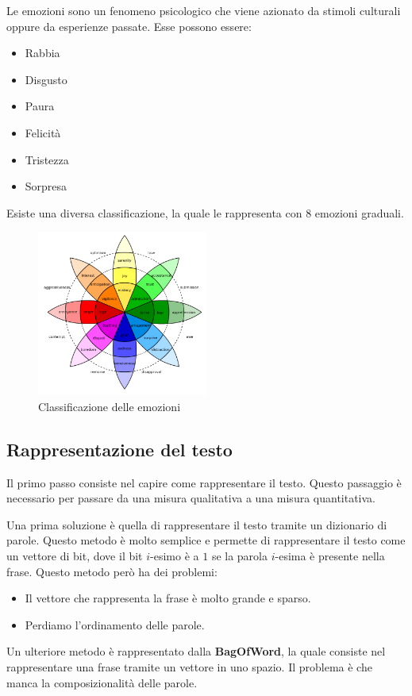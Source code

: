 \begin{definizione}
      Le emozioni sono un fenomeno psicologico che viene azionato da stimoli
      culturali oppure da esperienze passate. Esse possono essere:
      \begin{itemize}
            \item Rabbia
            \item Disgusto
            \item Paura
            \item Felicità
            \item Tristezza
            \item Sorpresa
      \end{itemize}
      Esiste una diversa classificazione, la quale le rappresenta con 8 emozioni
      graduali.
      \begin{figure}[!ht]
            \centering
            \includegraphics[width=0.5\textwidth]{./img/nlp/emozioni.png}
            \caption{Classificazione delle emozioni}
            \label{fig:emozioni}
      \end{figure}
\end{definizione}
\subsection{Rappresentazione del testo}
Il primo passo consiste nel capire come rappresentare il testo. Questo passaggio
è necessario per passare da una misura qualitativa a una misura quantitativa.

Una prima soluzione è quella di rappresentare il testo tramite un dizionario
di parole. Questo metodo è molto semplice e permette di rappresentare il testo
come un vettore di bit, dove il bit $i$-esimo è a $1$ se la parola $i$-esima
è presente nella frase. Questo metodo però ha dei problemi:
\begin{itemize}
      \item Il vettore che rappresenta la frase è molto grande e sparso.
      \item Perdiamo l'ordinamento delle parole.
\end{itemize}
Un ulteriore metodo è rappresentato dalla \textbf{BagOfWord}, la quale consiste
nel rappresentare una frase tramite un vettore in uno spazio. Il problema è che
manca la composizionalità delle parole.

